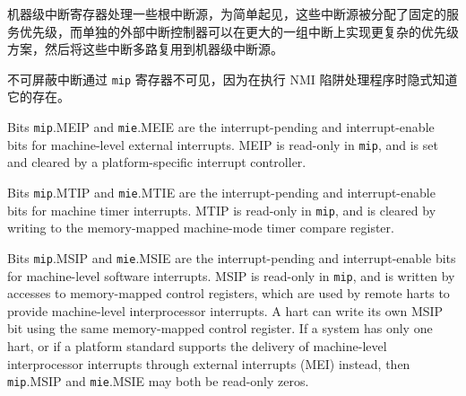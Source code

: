 \iffalse
\begin{commentary}
  The machine-level interrupt registers handle a few root interrupt
  sources which are assigned a fixed service priority for simplicity,
  while separate external interrupt controllers can implement a more
  complex prioritization scheme over a much larger set of interrupts
  that are then muxed into the machine-level interrupt sources.
\end{commentary}
\fi

\begin{commentary}
机器级中断寄存器处理一些根中断源，为简单起见，这些中断源被分配了固定的服务优先级，而单独的外部中断控制器可以在更大的一组中断上实现更复杂的优先级方案，然后将这些中断多路复用到机器级中断源。
\end{commentary}

\iffalse
\begin{commentary}
The non-maskable interrupt is not made visible via the {\tt mip}
register as its presence is implicitly known when executing the NMI
trap handler.
\end{commentary}
\fi

\begin{commentary}
不可屏蔽中断通过 {\tt mip} 寄存器不可见，因为在执行 NMI 陷阱处理程序时隐式知道它的存在。
\end{commentary}

\iffalse
Bits {\tt mip}.MEIP and {\tt mie}.MEIE are the interrupt-pending and
interrupt-enable bits for machine-level external interrupts.
MEIP is read-only in {\tt mip}, and is set and cleared by a
platform-specific interrupt controller.

Bits {\tt mip}.MTIP and {\tt mie}.MTIE are the interrupt-pending and
interrupt-enable bits for machine timer interrupts.
MTIP is read-only in {\tt mip}, and is cleared by writing to the memory-mapped
machine-mode timer compare register.

Bits {\tt mip}.MSIP and {\tt mie}.MSIE are the interrupt-pending and
interrupt-enable bits for machine-level software interrupts.
MSIP is read-only in {\tt mip}, and is written by accesses
to memory-mapped control registers, which are used by remote harts to
provide machine-level interprocessor interrupts.
A hart can write its
own MSIP bit using the same memory-mapped control register.
If a system has only one hart, or if a platform standard supports the
delivery of machine-level interprocessor interrupts through external
interrupts (MEI) instead, then {\tt mip}.MSIP and {\tt mie}.MSIE may
both be read-only zeros.

